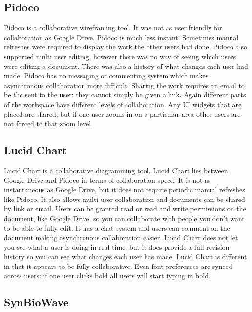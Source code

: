 \subsection{Pidoco}

Pidoco is a collaborative wireframing tool.  It was not as user friendly for collaboration as Google Drive.  Pidoco is much less instant.  Sometimes manual refreshes were required to display the work the other users had done.  Pidoco also supported multi user editing, however there was no way of seeing which users were editing a document. There was also a history of what changes each user had made.  Pidoco has no messaging or commenting system which makes asynchronous collaboration more difficult.  Sharing the work requires an email to be the sent to the user: they cannot simply be given a link.  Again different parts of the workspace have different levels of collaboration.  Any \ac{UI} widgets that are placed are shared, but if one user zooms in on a particular area other users are not forced to that zoom level.

\subsection{Lucid Chart}
Lucid Chart is a collaborative diagramming tool.  Lucid Chart lies between Google Drive and Pidoco in terms of collaboration speed.  It is not as instantaneous as Google Drive, but it does not require periodic manual refreshes like Pidoco.  It also allows multi user collaboration and documents can be shared by link or email.  Users can be granted read or read and write permissions on the document, like Google Drive, so you can collaborate with people you don't want to be able to fully edit.  It has a chat system and users can comment on the document making asynchronous collaboration easier.  Lucid Chart does not let you see what a user is doing in real time, but it does provide a full revision history so you can see what changes each user has made.  Lucid Chart is different in that it appears to be fully collaborative. Even font preferences are synced across users: if one user clicks bold all users will start typing in bold.

\subsection{SynBioWave}

